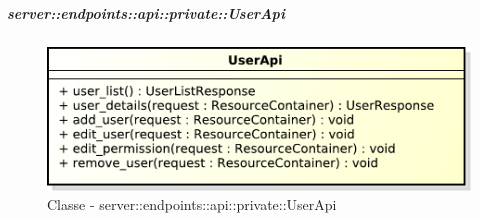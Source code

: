     \subparagraph{server::endpoints::api::private::UserApi} %
    \label{subp:bdsm_app_server_endpoints_api_private_userapi}
	\begin{figure}[!htbp]
		\centering
		\centerline{\includegraphics[scale=0.6]{./images/server/classes/endpoints/user_api.pdf}}
		\caption{Classe - server::endpoints::api::private::UserApi}
	\end{figure}
